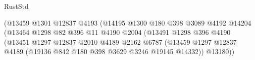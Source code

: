 \begin{lexlean}{RustStd}
\begin{coremodule}
                                                (@13459
                                                  @1301
                                                  @12837
                                                  @4193
                                                  (@14195
                                                    @1300
                                                    @180
                                                    @398
                                                    @3089
                                                    @4192
                                                    @14204
                                                    (@13464
                                                      @1298
                                                      @82
                                                      @396
                                                      @11
                                                      @4190
                                                      @2004
                                                      (@13491
                                                        @1298
                                                        @396
                                                        @4190
                                                        (@13451
                                                          @1297
                                                          @12837
                                                          @2010
                                                          @4189
                                                          @2162
                                                          @6787
                                                          (@13459
                                                            @1297
                                                            @12837
                                                            @4189
                                                            (@19136
                                                              @842
                                                              @180
                                                              @398
                                                              @3629
                                                              @3246
                                                              @19145
                                                              @14332))
                                                          @13180))

\end{coremodule}
\end{lexlean}
